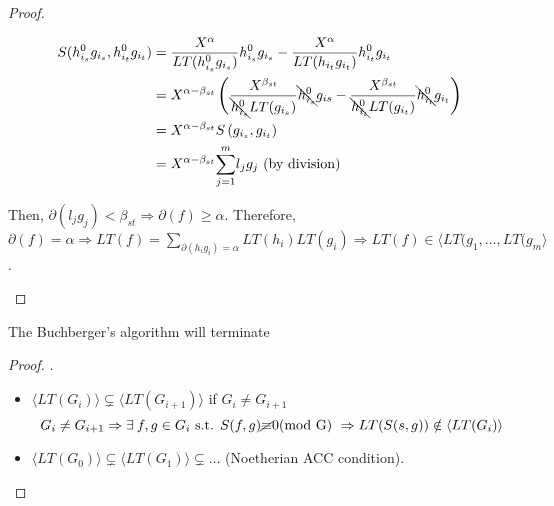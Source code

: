 \begin{theorem}
\begin{proof}
\begin{description} [leftmargin=0cm,labelindent=0cm]
          \begin{equation}
            \begin{split}
              S(h_{i_s}^0g_{i_s}, h_{i_t}^0g_{i_t}) &= \frac{X^\alpha}{LT(h_{i_s}^0g_{i_s})}h_{i_s}^0g_{i_s} - \frac{X^\alpha}{LT(h_{i_t}g_{i_t})}h_{i_t}^0g_{i_t} \\
              &= X^{\alpha-\beta_{st}} \left( \frac{X^{\beta_{st}}}{\bcancel{h_{i_s}^0}LT(g_{i_s})}\bcancel{h_{i_s}^0}g_{is} - \frac{X^{\beta_{st}}}{\bcancel{h_{i_t}^0}LT(g_{i_t})}\bcancel{h_{i_t}^0}g_{i_t}  \right) \\
              &= X^{\alpha-\beta_{st}} S\left(g_{i_s},g_{i_t}\right) \\
              &= X^{\alpha-\beta_{st}}\overset{m}{\underset{j = 1}{\sum}}{l_jg_j} \text{ (by division)}
            \end{split}
          \end{equation}
      \item Then, $\partial(l_jg_j) < \beta_{st} \Rightarrow \partial(f) \geq \alpha$. Therefore, $\partial(f) = \alpha \Rightarrow LT(f) = \underset{\partial(h_ig_i) = \alpha}{\sum}LT(h_i)LT(g_i) \Rightarrow LT(f) \in \langle LT(g_1,\dots, LT(g_m \rangle$.
 
    \end{description}
  \end{proof}
\end{theorem}

\begin{theorem}
  The Buchberger's algorithm will terminate
  \begin{proof}
    $.$
    \begin{itemize}
      \item $\langle LT(G_i) \rangle \subsetneq \langle LT(G_{i+1}) \rangle$ if $G_i \neq G_{i+1}$
        \[
          G_i \neq G_{i+1} \Rightarrow \exists f, g \in G_i \text{ s.t. } S(f,g) \cancel{\equiv} 0 \text{(mod G) } \Rightarrow LT(S(s,g)) \notin \langle LT(G_i) \rangle
        \]
      \item $\langle LT(G_0) \rangle \subsetneq \langle LT(G_1) \rangle \subsetneq \dots$ (Noetherian ACC condition).
    \end{itemize}
  \end{proof}
\end{theorem}
